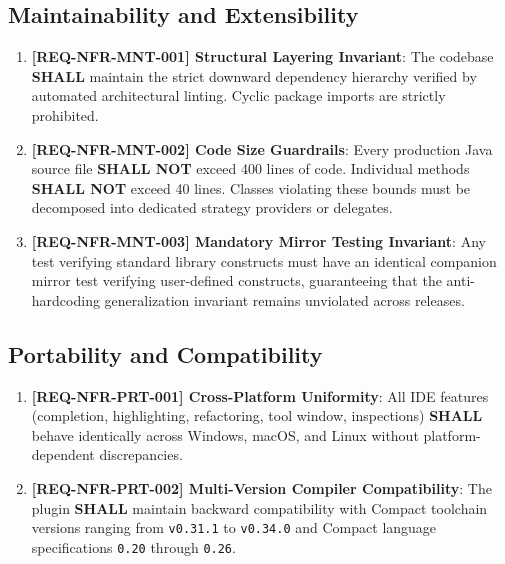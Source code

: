 \subsection{Maintainability and Extensibility}
\label{sec:maintainability}

\begin{enumerate}
    \item \textbf{[REQ-NFR-MNT-001] Structural Layering Invariant}:
    The codebase \textbf{SHALL} maintain the strict downward dependency hierarchy verified by automated architectural linting. Cyclic package imports are strictly prohibited.
    
    \item \textbf{[REQ-NFR-MNT-002] Code Size Guardrails}:
    Every production Java source file \textbf{SHALL NOT} exceed 400 lines of code. Individual methods \textbf{SHALL NOT} exceed 40 lines. Classes violating these bounds must be decomposed into dedicated strategy providers or delegates.
    
    \item \textbf{[REQ-NFR-MNT-003] Mandatory Mirror Testing Invariant}:
    Any test verifying standard library constructs must have an identical companion mirror test verifying user-defined constructs, guaranteeing that the anti-hardcoding generalization invariant remains unviolated across releases.
\end{enumerate}

\subsection{Portability and Compatibility}
\label{sec:portability}

\begin{enumerate}
    \item \textbf{[REQ-NFR-PRT-001] Cross-Platform Uniformity}:
    All IDE features (completion, highlighting, refactoring, tool window, inspections) \textbf{SHALL} behave identically across Windows, macOS, and Linux without platform-dependent discrepancies.
    
    \item \textbf{[REQ-NFR-PRT-002] Multi-Version Compiler Compatibility}:
    The plugin \textbf{SHALL} maintain backward compatibility with Compact toolchain versions ranging from \texttt{v0.31.1} to \texttt{v0.34.0} and Compact language specifications \texttt{0.20} through \texttt{0.26}.
\end{enumerate}
